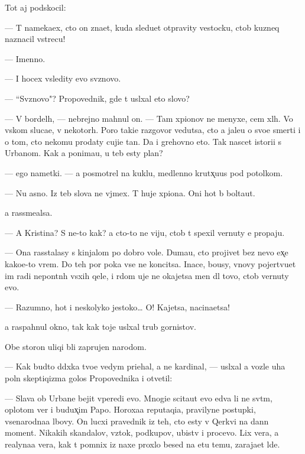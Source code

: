 \documentclass[10pt]{book}
\begin{document}
Tot aj podskocil:

— T{\yi} nameka{\y}ex, cto on zna{\y}et, kuda sledu{\y}et otpravity vestocku, ctob{\yi} kuzneq naznacil vstrecu!

— Imenno.

— I hocex v{\yi}sledity {\y}evo sv{\ia}znovo.

— ``Sv{\ia}znovo"? Propovednik, gde t{\yi} usl{\yi}xal eto slovo?

— V bordel{\ia}h, — nebrejno mahnul on. — Tam xpionov ne menyxe, cem xl{\iu}h. Vo vs{\ia}kom sluca{\y}e, v nekotor{\yi}h. Poro{\y} taki{\y}e razgovor{\yi} vedutsa, cto {\y}a jale{\y}u o svo{\y}e{\y} smerti i o tom, cto nekomu prodaty cuji{\y}e ta{\y}n{\yi}. Da i grehovno eto. Tak nascet istori{\y}i s Urbanom. Kak {\y}a ponima{\y}u, u teb{\ia} {\y}esty plan?

— {\Y}ego nametki. — {\Y}a posmotrel na kuklu, medlenno krut{\ia}x̨u{\y}us{\ia} pod potolkom.

— Nu {\y}asno. Iz teb{\ia} slova ne v{\yi}jmex. T{\yi} huje xpiona. Oni hot{\ia} b{\yi} bolta{\y}ut.

{\Y}a rassme{\y}alsa.

— A Kristina? S ne{\y}-to kak? {\Y}a cto-to ne viju, ctob{\yi} t{\yi} spexil vernuty {\y}e{\y} propaju.

— Ona rasstalasy s kinjalom po dobro{\y} vole. Duma{\y}u, cto projivet bez nevo {\y}ex̨e kako{\y}e-to vrem{\ia}. Do teh por poka vse ne koncitsa. Inace, bo{\y}usy, vnovy pojertvu{\y}et im radi nepon{\ia}tn{\yi}h v{\yi}sxih qele{\y}, i r{\ia}dom uje ne okajetsa men{\ia} dl{\ia} tovo, ctob{\yi} vernuty {\y}evo.

— Razumno, hot{\ia} i neskolyko jestoko… O! Kajetsa, nacina{\y}etsa!

{\Y}a raspahnul okno, tak kak toje usl{\yi}xal trub{\yi} gornistov.

Obe storon{\yi} uliqi b{\yi}li zaprujen{\yi} narodom.

— Kak budto d{\ia}d{\iu}xka tvo{\y}e{\y} vedym{\yi} pri{\y}ehal, a ne kardinal, — usl{\yi}xal {\y}a vozle uha poln{\yi}{\y} skeptiqizma golos Propovednika i otvetil:

— Slava ob Urbane bejit vperedi {\y}evo. Mnogi{\y}e scita{\y}ut {\y}evo {\y}edva li ne sv{\ia}t{\yi}m, oplotom ver{\yi} i budux̨im Papo{\y}. Horoxa{\y}a reputaqi{\y}a, pravilyn{\yi}{\y}e postupki, vsenarodna{\y}a l{\iu}bovy. On lucxi{\y} pravednik iz teh, cto {\y}esty v Qerkvi na dann{\yi}{\y} moment. Nikakih skandalov, vz{\ia}tok, podkupov, ubi{\y}stv i procevo. Lix vera, a realyna{\y}a vera, kak t{\yi} pomnix iz naxe{\y} proxlo{\y} besed{\yi} na etu temu, zaraja{\y}et l{\iu}de{\y}.
\end{document}
